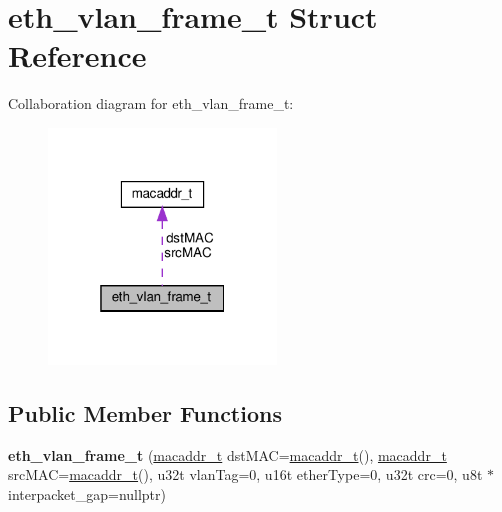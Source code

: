 \hypertarget{structeth__vlan__frame__t}{}\section{eth\+\_\+vlan\+\_\+frame\+\_\+t Struct Reference}
\label{structeth__vlan__frame__t}


Collaboration diagram for eth\+\_\+vlan\+\_\+frame\+\_\+t\+:\nopagebreak
\begin{figure}[H]
\begin{center}
\leavevmode
\includegraphics[width=172pt]{structeth__vlan__frame__t__coll__graph}
\end{center}
\end{figure}
\subsection*{Public Member Functions}
\begin{DoxyCompactItemize}
\item 
\mbox{\label{structeth__vlan__frame__t_afd8ff79bdc0fd97dd158d1b0e6842363}} 
{\bfseries eth\+\_\+vlan\+\_\+frame\+\_\+t} (\hyperlink{structmacaddr__t}{macaddr\+\_\+t} dst\+M\+AC=\hyperlink{structmacaddr__t}{macaddr\+\_\+t}(), \hyperlink{structmacaddr__t}{macaddr\+\_\+t} src\+M\+AC=\hyperlink{structmacaddr__t}{macaddr\+\_\+t}(), u32t vlan\+Tag=0, u16t ether\+Type=0, u32t crc=0, u8t $\ast$interpacket\+\_\+gap=nullptr)
\end{DoxyCompactItemize}
